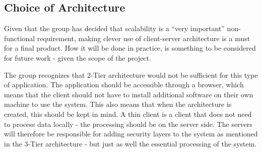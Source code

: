 \subsection{Choice of Architecture}

Given that the group has decided that scalability is a ``very important'' non-functional 
requirement, making clever use of client-server architecture is a must for a final product. 
How it will be done in practice, is something to be considered for future work - given the 
scope of the project. 


The group recognizes that 2-Tier architecture would not be sufficient for this type of 
application. The application should be accessible through a browser, which means that the client 
should not have to install additional software on their own machine to use the system. This also means 
that when the architecture is created, this should be kept in mind. A thin client is a 
client that does not need to process data locally - the processing should be on the server 
side\cite{thinclients08}. The servers will therefore be responsible for adding security 
layers to the system as mentioned in the 3-Tier architecture - but just as well the 
essential processing of the system.
